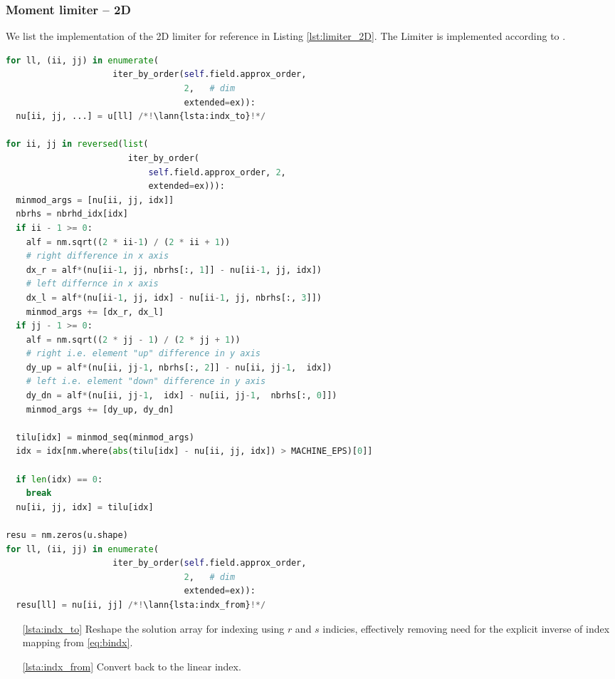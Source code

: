\subsubsection{Moment limiter -- 2D}
\label{se:i_moment_lim_2D}
We list the implementation of the 2D limiter for reference in Listing \ref{lst:limiter_2D}. The Limiter is
implemented according to .
\setcounter{lstannotation}{0}
\begin{lstlisting}[language=Python, caption=Moment limiter for
cartesian grid. \label{lst:limiter_2D}]
for ll, (ii, jj) in enumerate(
                     iter_by_order(self.field.approx_order,
                                   2,   # dim
                                   extended=ex)):
  nu[ii, jj, ...] = u[ll] /*!\lann{lsta:indx_to}!*/

for ii, jj in reversed(list(
                        iter_by_order(
                            self.field.approx_order, 2,
                            extended=ex))):
  minmod_args = [nu[ii, jj, idx]]
  nbrhs = nbrhd_idx[idx]
  if ii - 1 >= 0:
    alf = nm.sqrt((2 * ii-1) / (2 * ii + 1))
    # right difference in x axis
    dx_r = alf*(nu[ii-1, jj, nbrhs[:, 1]] - nu[ii-1, jj, idx])
    # left differnce in x axis
    dx_l = alf*(nu[ii-1, jj, idx] - nu[ii-1, jj, nbrhs[:, 3]])
    minmod_args += [dx_r, dx_l]
  if jj - 1 >= 0:
    alf = nm.sqrt((2 * jj - 1) / (2 * jj + 1))
    # right i.e. element "up" difference in y axis
    dy_up = alf*(nu[ii, jj-1, nbrhs[:, 2]] - nu[ii, jj-1,  idx])
    # left i.e. element "down" difference in y axis
    dy_dn = alf*(nu[ii, jj-1,  idx] - nu[ii, jj-1,  nbrhs[:, 0]])
    minmod_args += [dy_up, dy_dn]

  tilu[idx] = minmod_seq(minmod_args)
  idx = idx[nm.where(abs(tilu[idx] - nu[ii, jj, idx]) > MACHINE_EPS)[0]]

  if len(idx) == 0:
    break
  nu[ii, jj, idx] = tilu[idx]

resu = nm.zeros(u.shape)
for ll, (ii, jj) in enumerate(
                     iter_by_order(self.field.approx_order,
                                   2,   # dim
                                   extended=ex)):
  resu[ll] = nu[ii, jj] /*!\lann{lsta:indx_from}!*/
\end{lstlisting}
\begin{itemize}
    \item[\ref{lsta:indx_to}] Reshape the solution array for indexing using $r$ and $s$ indicies,
    effectively removing need for the explicit inverse of index mapping from \eqref{eq:bindx}.
    \item [\ref{lsta:indx_from}] Convert back to the linear index.
\end{itemize}


